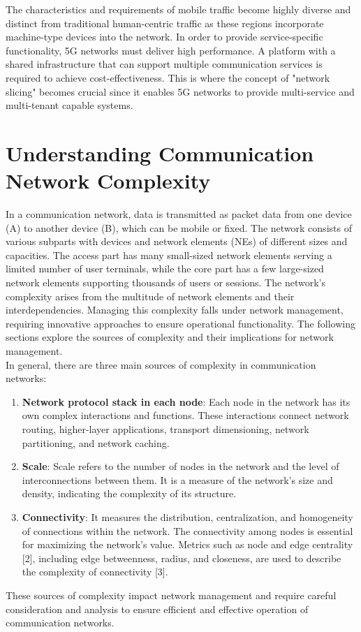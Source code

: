 The characteristics and requirements of mobile traffic become highly diverse and distinct from traditional human-centric traffic as these regions incorporate machine-type devices into the network. In order to provide service-specific functionality, 5G networks must deliver high performance. A platform with a shared infrastructure that can support multiple communication services is required to achieve cost-effectiveness. This is where the concept of "network slicing" becomes crucial since it enables 5G networks to provide multi-service and multi-tenant capable systems.

\section{Understanding Communication Network Complexity}
In a communication network, data is transmitted as packet data from one device (A) to another device (B), which can be mobile or fixed. The network consists of various subparts with devices and network elements (NEs) of different sizes and capacities. The access part has many small-sized network elements serving a limited number of user terminals, while the core part has a few large-sized network elements supporting thousands of users or sessions. The network's complexity arises from the multitude of network elements and their interdependencies. Managing this complexity falls under network management, requiring innovative approaches to ensure operational functionality. The following sections explore the sources of complexity and their implications for network management.\\
In general, there are three main sources of complexity in communication networks:
\begin{enumerate}
	\item \textbf{Network protocol stack in each node}: Each node in the network has its own complex interactions and functions. These interactions connect network routing, higher-layer applications, transport dimensioning, network partitioning, and network caching.
	\item \textbf{Scale}: Scale refers to the number of nodes in the network and the level of interconnections between them. It is a measure of the network's size and density, indicating the complexity of its structure.
	\item \textbf{Connectivity}: It measures the distribution, centralization, and homogeneity of connections within the network. The connectivity among nodes is essential for maximizing the network's value. Metrics such as node and edge centrality \cite{bibid}[2], including edge betweenness, radius, and closeness, are used to describe the complexity of connectivity \cite{bibid}[3].
\end{enumerate}
These sources of complexity impact network management and require careful consideration and analysis to ensure efficient and effective operation of communication networks.
